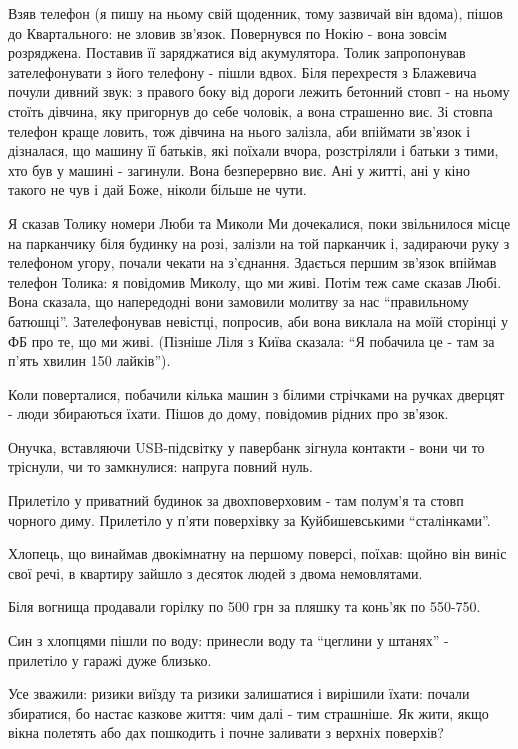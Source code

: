 Взяв телефон (я пишу на ньому свій щоденник, тому зазвичай він вдома), пішов до
Квартального: не зловив зв'язок. Повернувся по Нокію - вона зовсім розряджена.
Поставив її заряджатися від акумулятора. Толик запропонував зателефонувати з
його телефону - пішли вдвох. Біля перехрестя  з Блажевича почули дивний звук: з
правого боку від дороги лежить бетонний стовп - на ньому стоїть дівчина, яку
пригорнув до себе чоловік, а вона страшенно виє. Зі стовпа телефон краще
ловить, тож дівчина на нього залізла, аби впіймати зв'язок і дізналася, що
машину її батьків, які поїхали вчора, розстріляли і батьки з тими, хто був у
машині - загинули. Вона безперервно виє. Ані у житті, ані у кіно  такого не чув
і дай Боже, ніколи більше не чути.

Я сказав Толику номери Люби та Миколи  Ми дочекалися, поки звільнилося місце на
парканчику біля будинку на розі, залізли на той парканчик і, задираючи руку з
телефоном угору, почали чекати на з'єднання. Здається першим зв'язок впіймав
телефон Толика: я повідомив Миколу, що ми живі. Потім теж саме сказав Любі.
Вона сказала, що напередодні вони замовили молитву за нас \enquote{правильному
батюшці}. Зателефонував невістці, попросив, аби вона виклала на моїй сторінці у
ФБ про те, що ми живі. (Пізніше Ліля з Київа сказала: \enquote{Я побачила це - там за
п'ять хвилин 150 лайків}).

Коли поверталися, побачили кілька машин з білими стрічками на ручках дверцят -
люди збираються їхати. Пішов до дому, повідомив рідних про зв'язок.

Онучка, вставляючи USB-підсвітку у павербанк зігнула контакти - вони чи то
тріснули, чи то замкнулися: напруга повний нуль.

Прилетіло у приватний будинок за двохповерховим - там полум'я та стовп чорного
диму. Прилетіло у п'яти поверхівку за Куйбишевськими \enquote{сталінками}.

Хлопець,  що винаймав двокімнатну на першому поверсі, поїхав: щойно він виніс
свої речі, в квартиру зайшло з десяток людей з двома немовлятами.

Біля вогнища продавали горілку по 500 грн за пляшку та конь'як по 550-750.

Син з хлопцями пішли по воду: принесли воду та \enquote{цеглини у штанях} - прилетіло у
гаражі дуже близько. 

Усе зважили: ризики виїзду та ризики залишатися і вирішили їхати: почали
збиратися, бо настає казкове життя: чим далі - тим страшніше. Як жити, якщо
вікна полетять або дах пошкодить і почне заливати з верхніх поверхів?

